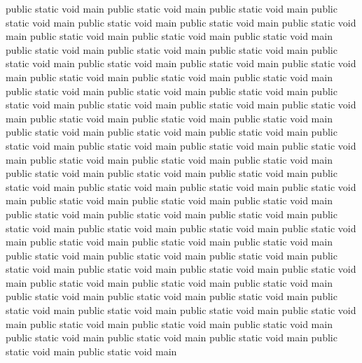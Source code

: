 \documentclass[12pt]{article}
\begin{document}
public static void main
public static void main
public static void main
public static void main
public static void main
public static void main
public static void main
public static void main
public static void main
public static void main
public static void main
public static void main
public static void main
public static void main
public static void main
public static void main
public static void main
public static void main
public static void main
public static void main
public static void main
public static void main
public static void main
public static void main
public static void main
public static void main
public static void main
public static void main
public static void main
public static void main
public static void main
public static void main
public static void main
public static void main
public static void main
public static void main
public static void main
public static void main
public static void main
public static void main
public static void main
public static void main
public static void main
public static void main
public static void main
public static void main
public static void main
public static void main
public static void main
public static void main
public static void main
public static void main
public static void main
public static void main
public static void main
public static void main
public static void main
public static void main
public static void main
public static void main
public static void main
public static void main
public static void main
public static void main
public static void main
public static void main
public static void main
public static void main
public static void main
public static void main
public static void main
public static void main
public static void main
public static void main
public static void main
public static void main
public static void main
public static void main
public static void main
public static void main
public static void main
public static void main
public static void main
public static void main
public static void main
\end{document}
